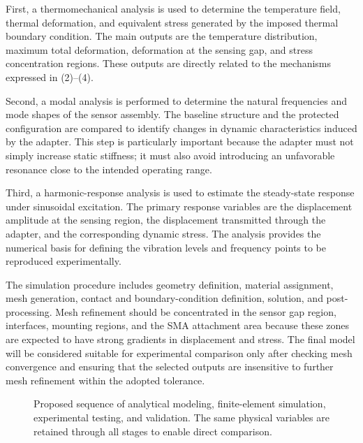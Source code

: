 \documentclass[conference]{IEEEtran}
\begin{document}
First, a thermomechanical analysis is used to determine the temperature field, thermal deformation, and equivalent stress generated by the imposed thermal boundary condition. The main outputs are the temperature distribution, maximum total deformation, deformation at the sensing gap, and stress concentration regions. These outputs are directly related to the mechanisms expressed in (2)--(4).

Second, a modal analysis is performed to determine the natural frequencies and mode shapes of the sensor assembly. The baseline structure and the protected configuration are compared to identify changes in dynamic characteristics induced by the adapter. This step is particularly important because the adapter must not simply increase static stiffness; it must also avoid introducing an unfavorable resonance close to the intended operating range.

Third, a harmonic-response analysis is used to estimate the steady-state response under sinusoidal excitation. The primary response variables are the displacement amplitude at the sensing region, the displacement transmitted through the adapter, and the corresponding dynamic stress. The analysis provides the numerical basis for defining the vibration levels and frequency points to be reproduced experimentally.

The simulation procedure includes geometry definition, material assignment, mesh generation, contact and boundary-condition definition, solution, and post-processing. Mesh refinement should be concentrated in the sensor gap region, interfaces, mounting regions, and the SMA attachment area because these zones are expected to have strong gradients in displacement and stress. The final model will be considered suitable for experimental comparison only after checking mesh convergence and ensuring that the selected outputs are insensitive to further mesh refinement within the adopted tolerance.


\begin{figure}[t]
\centering
{}
\caption{Proposed sequence of analytical modeling, finite-element simulation, experimental testing, and validation. The same physical variables are retained through all stages to enable direct comparison.}
\label{fig:method_sequence}
\end{figure}
\end{document}
